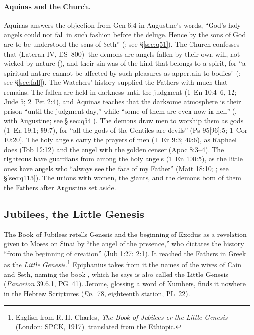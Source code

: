 \paragraph{Aquinas and the Church.} Aquinas answers the objection from Gen
6:4 in Augustine's words, ``God's holy angels could not fall in such fashion
before the deluge. Hence by the sons of God are to be understood the sons of
Seth'' (; see \S\ref{sec:q51}). The Church confesses
that  (Lateran IV, DS~800): the demons are
angels fallen by their own will, not wicked by nature (),
and their sin was of the kind that belongs to a spirit, for ``a spiritual
nature cannot be affected by such pleasures as appertain to bodies'' (; see \S\ref{sec:fall}). The Watchers' history supplied
the Fathers with much that remains. The fallen are held in darkness until
the judgment (1~En 10:4--6, 12; Jude 6; 2~Pet 2:4), and Aquinas teaches that
the darksome atmosphere is their prison ``until the judgment day,'' while
``some of them are even now in hell'' (, with Augustine; see
\S\ref{sec:q64}). The demons draw men to worship them as gods (1~En 19:1;
99:7), for ``all the gods of the Gentiles are devils'' (Ps 95[96]:5; 1~Cor
10:20). The holy angels carry the prayers of men (1~En 9:3; 40:6), as Raphael
does (Tob 12:12) and the angel with the golden censer (Apoc 8:3--4). The
righteous have guardians from among the holy angels (1~En 100:5), as the
little ones have angels who ``always see the face of my Father'' (Matt
18:10; ; see \S\ref{sec:q113}). The unions with women, the
giants, and the demons born of them the Fathers after Augustine set aside.

\sectionguard
\subsection{Jubilees, the Little Genesis}\label{sec:bc-jubilees}

The Book of Jubilees retells Genesis and the beginning of Exodus as a
revelation given to Moses on Sinai by ``the angel of the presence,'' who
dictates the history ``from the beginning of creation'' (Jub 1:27; 2:1). It
reached the Fathers in Greek as the \emph{Little Genesis}.\footnote{English
from R. H. Charles, \emph{The Book of Jubilees or the Little Genesis}
(London: SPCK, 1917), translated from the Ethiopic.} Epiphanius takes
from it the names of the wives of Cain and Seth, naming the book , which he says is also called the Little Genesis
(\emph{Panarion} 39.6.1, PG~41). Jerome, glossing a word of Numbers, finds it
nowhere in the Hebrew Scriptures  (\emph{Ep.}\ 78, eighteenth station,
PL~22).

